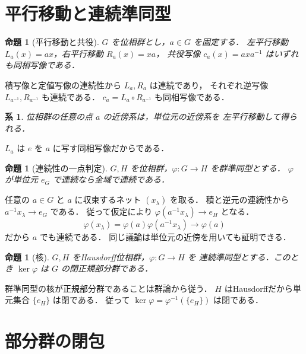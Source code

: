 \documentclass[a5paper,10pt,onecolumn]{jsarticle}
\makeatletter
\theoremstyle{mathnotetheorem}
\newtheorem{proposition}[theorem]{命題}
\newtheorem{corollary}[theorem]{系}
\renewcommand{\proofname}{証明}
\renewenvironment{proof}[1][\proofname]{%
  \par\pushQED{\qed}\normalfont\topsep4\p@\@plus2\p@\relax
  \trivlist\item[\hskip\labelsep\bfseries #1]\ignorespaces
}{\popQED\endtrivlist\@endpefalse}
\makeatother
\begin{document}
\section{平行移動と連続準同型}

\begin{proposition}[平行移動と共役]\label{prop:translations}
$G$ を位相群とし，$a\in G$ を固定する．
左平行移動 $L_a(x)=ax$，右平行移動 $R_a(x)=xa$，
共役写像 $c_a(x)=axa^{-1}$ はいずれも同相写像である．
\end{proposition}
\begin{proof}
積写像と定値写像の連続性から $L_a,R_a$ は連続であり，
それぞれ逆写像 $L_{a^{-1}},R_{a^{-1}}$ も連続である．
$c_a=L_a\circ R_{a^{-1}}$ も同相写像である．
\end{proof}

\begin{corollary}\label{cor:local}
位相群の任意の点 $a$ の近傍系は，単位元の近傍系を
左平行移動して得られる．
\end{corollary}
\begin{proof}
$L_a$ は $e$ を $a$ に写す同相写像だからである．
\end{proof}

\begin{proposition}[連続性の一点判定]\label{prop:hom-cont}
$G,H$ を位相群，$\varphi:G\to H$ を群準同型とする．
$\varphi$ が単位元 $e_G$ で連続なら全域で連続である．
\end{proposition}
\begin{proof}
任意の $a\in G$ と $a$ に収束するネット $(x_\lambda)$
を取る．
積と逆元の連続性から
$a^{-1}x_\lambda\to e_G$ である．
従って仮定により
$\varphi(a^{-1}x_\lambda)\to e_H$ となる．
\[
 \varphi(x_\lambda)
 =\varphi(a)\varphi(a^{-1}x_\lambda)
 \longrightarrow\varphi(a)
\]
だから $a$ でも連続である．
同じ議論は単位元の近傍を用いても証明できる．
\end{proof}

\begin{proposition}[核]\label{prop:kernel}
$G,H$ をHausdorff位相群，$\varphi:G\to H$ を
連続準同型とする．このとき
$\ker\varphi$ は $G$ の閉正規部分群である．
\end{proposition}
\begin{proof}
群準同型の核が正規部分群であることは群論から従う．
$H$ はHausdorffだから単元集合 $\{e_H\}$ は閉である．
従って
$\ker\varphi=\varphi^{-1}(\{e_H\})$ は閉である．
\end{proof}

\section{部分群の閉包}
\end{document}
